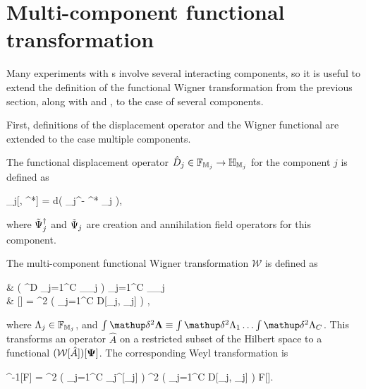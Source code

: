 \section{Multi-component functional transformation}

Many experiments with s involve several interacting components, so it is useful to extend the definition of the functional Wigner transformation from the previous section, along with  and , to the case of several components.

First, definitions of the displacement operator and the Wigner functional are extended to the case multiple components.

\begin{definition}
	The functional displacement operator $\hat{D}_j \in \mathbb{F}_{\mathbb{M}_j} \rightarrow \mathbb{H}_{\mathbb{M}_j}$ for the component $j$ is defined as
	\begin{eqn*}
		_j[\Lambda, \Lambda^*] = \exp \int d\xvec \left(
			\Lambda \Psiop_j^\dagger - \Lambda^* \Psiop_j
		\right),
	\end{eqn*}
	where $\tilde{\Psi}_j^\dagger$ and $\tilde{\Psi}_j$ are creation and annihilation field operators for this component.
\end{definition}

\begin{definition}
\label{def:wigner:mc:w-transformation}
	The multi-component functional Wigner transformation $\mathcal{W}$ is defined as
	\begin{eqn*}
		&  \in \left( ^D \rightarrow \prod_{j=1}^C _{\restbasis_j} \right)
			\rightarrow \prod_{j=1}^C _{\restbasis_j}
			\rightarrow \mathbb{C} \\
		& [\hat{A}]
		=  \int \fdelta^2 \bLambda
			\left( \prod_{j=1}^C D[\Lambda_j, \Psi_j] \right)
			\Trace{ \hat{A} \prod_{j=1}^C \hat{D}_j[\Lambda_j] },
	\end{eqn*}
	where $\Lambda_j \in \mathbb{F}_{\mathbb{M}_j}$, and $\int \fdelta^2 \bLambda \equiv \int \fdelta^2 \Lambda_1 \ldots \int \fdelta^2 \Lambda_C$.
	This transforms an operator $\hat{A}$ on a restricted subset of the Hilbert space to a functional $(\mathcal{W}[\hat{A}])[\mathbf{\Psi}]$.
	The corresponding Weyl transformation is
	\begin{eqn*}
		^{-1}[F]
		=  \int \fdelta^2 \bXi
			\left( \prod_{j=1}^C _j^{\dagger}[\Xi_j] \right)
			\int \fdelta^2 \bPhi
				\left( \prod_{j=1}^C D[\Phi_j, \Xi_j] \right)
				F[\bPhi].
	\end{eqn*}
\end{definition}

